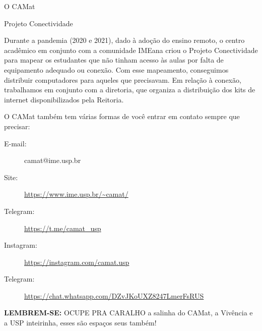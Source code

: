 \begin{secao}{O CAMat}
\begin{subsecao}{Projeto Conectividade}

Durante a pandemia (2020 e 2021), dado à adoção do ensino remoto, o centro acadêmico em conjunto 
com a comunidade IMEana criou o Projeto Conectividade para mapear os estudantes que não tinham acesso
às aulas por falta de equipamento adequado ou conexão. Com esse mapeamento, conseguimos distribuir 
computadores para aqueles que precisavam. Em relação à conexão, trabalhamos em conjunto com a diretoria, 
que organiza a distribuição dos kits de internet disponibilizados pela Reitoria.

\end{subsecao}

O CAMat também tem várias formas de você entrar em contato sempre que precisar:

\begin{description}
\item [E-mail:] camat@ime.usp.br
\item [Site:] \url{https://www.ime.usp.br/~camat/}
\item [Telegram:] \url{https://t.me/camat_usp}
\item [Instagram:] \url{https://instagram.com/camat.usp}
\item [Telegram:] \url{https://chat.whatsapp.com/DZvJKoUXZ8247LmerFsRUS}
\end{description}

\textbf{LEMBREM-SE:} OCUPE PRA CARALHO a salinha do CAMat, a Vivência e a USP inteirinha, esses são espaços seus também!


\end{secao}
